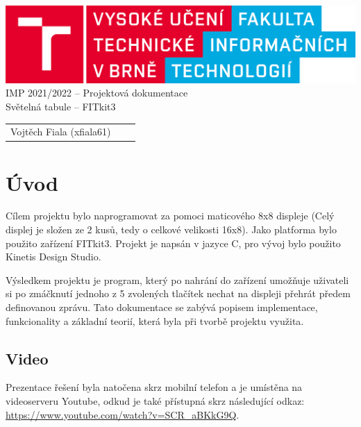 \documentclass[14pt]{extarticle}
\begin{document}
	\begin{titlepage}
		\begin{center}
			\includegraphics[scale=0.15]{fit_logo.png}
			\\
			{\Large
				 \huge{{IMP 2021/2022 -- Projektová dokumentace\\[0.5em]}}}
				 \LARGE{Světelná tabule -- FITkit3\\}
		{\LARGE
			\begin{tabular}{l c r}
            Vojtěch Fiala (xfiala61)
            \end{tabular}
			
		}
		\end{center}
	\end{titlepage}
	
	
	\newpage
    \section{Úvod}
    
    Cílem projektu bylo naprogramovat  za pomoci maticového 8x8 displeje (Celý displej je složen ze 2 kusů, tedy o celkové velikosti 16x8). Jako platforma bylo použito zařízení FITkit3. Projekt je napsán v jazyce C, pro vývoj bylo použito Kinetis Design Studio.
    
    Výsledkem projektu je program, který po nahrání do zařízení umožňuje uživateli si po zmáčknutí jednoho z 5 zvolených tlačítek nechat na displeji přehrát předem definovanou zprávu. Tato dokumentace se zabývá popisem implementace, funkcionality a základní teorií, která byla při tvorbě projektu využita.

    \subsection{Video}
     \label{uv}
    Prezentace řešení byla natočena skrz mobilní telefon a je umístěna na videoserveru Youtube, odkud je také přístupná skrz následující odkaz: \url{https://www.youtube.com/watch?v=SCR_aBKkG9Q}.
\end{document}
